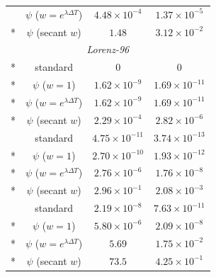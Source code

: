 \begin{longtable}{@{}cccc@{}}
 & $\psi$ ($w=e^{\lambda\Delta T}$) & $4.48\times 10^{-4}$ & $1.37\times 10^{-5}$\\*
 & $\psi$ (secant $w$) & $1.48$ & $3.12\times 10^{-2}$\\
\midrule
\multicolumn{4}{c}{\textit{Lorenz-96}}\\*
\multirow{4}{*}{$4$} & standard & $0$ & $0$\\*
 & $\psi$ ($w=1$) & $1.62\times 10^{-9}$ & $1.69\times 10^{-11}$\\*
 & $\psi$ ($w=e^{\lambda\Delta T}$) & $1.62\times 10^{-9}$ & $1.69\times 10^{-11}$\\*
 & $\psi$ (secant $w$) & $2.29\times 10^{-4}$ & $2.82\times 10^{-6}$\\
\addlinespace[3pt]
\multirow{4}{*}{$8$} & standard & $4.75\times 10^{-11}$ & $3.74\times 10^{-13}$\\*
 & $\psi$ ($w=1$) & $2.70\times 10^{-10}$ & $1.93\times 10^{-12}$\\*
 & $\psi$ ($w=e^{\lambda\Delta T}$) & $2.76\times 10^{-6}$ & $1.76\times 10^{-8}$\\*
 & $\psi$ (secant $w$) & $2.96\times 10^{-1}$ & $2.08\times 10^{-3}$\\
\addlinespace[3pt]
\multirow{4}{*}{$16$} & standard & $2.19\times 10^{-8}$ & $7.63\times 10^{-11}$\\*
 & $\psi$ ($w=1$) & $5.80\times 10^{-6}$ & $2.09\times 10^{-8}$\\*
 & $\psi$ ($w=e^{\lambda\Delta T}$) & $5.69$ & $1.75\times 10^{-2}$\\*
 & $\psi$ (secant $w$) & $73.5$ & $4.25\times 10^{-1}$\\
\end{longtable}\endgroup
